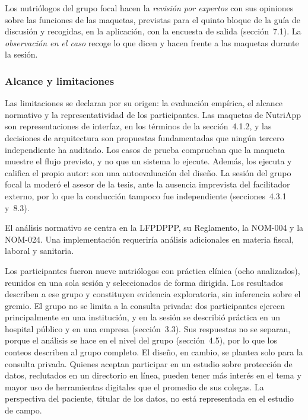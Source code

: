 \documentclass[12pt, a4paper]{article}
\begin{document}
Los nutriólogos del grupo focal hacen la \textit{revisión por
expertos} con sus opiniones sobre las funciones de las maquetas,
previstas para el quinto bloque de la guía de discusión y recogidas, en
la aplicación, con la encuesta de salida (sección~7.1). La
\textit{observación en el caso} recoge lo que dicen y hacen frente a
las maquetas durante la sesión.
 
\subsubsection{Alcance y limitaciones}
 
Las limitaciones se declaran por su origen: la evaluación empírica, el
alcance normativo y la representatividad de los participantes. Las
maquetas de NutriApp son representaciones de interfaz, en los términos
de la sección~4.1.2, y las decisiones de arquitectura son propuestas
fundamentadas que ningún tercero independiente ha auditado. Los casos de
prueba comprueban que la maqueta muestre el flujo previsto, y no que un
sistema lo ejecute. Además, los ejecuta y califica el propio autor: son
una autoevaluación del diseño. La sesión del grupo focal la moderó el
asesor de la tesis, ante la ausencia imprevista del facilitador externo,
por lo que la conducción tampoco fue independiente (secciones~4.3.1
y~8.3).
 
El análisis normativo se centra en la LFPDPPP, su Reglamento, la
NOM-004 y la NOM-024. Una implementación requeriría análisis
adicionales en materia fiscal, laboral y sanitaria.
 
Los participantes fueron nueve nutriólogos con práctica clínica (ocho
analizados), reunidos en una sola sesión y seleccionados de forma
dirigida. Los
resultados describen a ese grupo y constituyen evidencia exploratoria,
sin inferencia sobre el gremio. El grupo no se limita a la consulta
privada: dos participantes ejercen principalmente en una institución, y
en la sesión se describió práctica en un hospital público y en una
empresa (sección~3.3). Sus respuestas no se separan, porque el análisis
se hace en el nivel del grupo (sección~4.5), por lo que los conteos
describen al grupo completo. El diseño, en cambio, se plantea solo para
la consulta privada. Quienes aceptan participar en un estudio
sobre protección de datos, reclutados en un directorio en línea, pueden
tener más interés en el tema y mayor uso de herramientas digitales que
el promedio de sus colegas. La perspectiva del paciente, titular de los
datos, no está representada en el estudio de campo.
 
\end{document}
